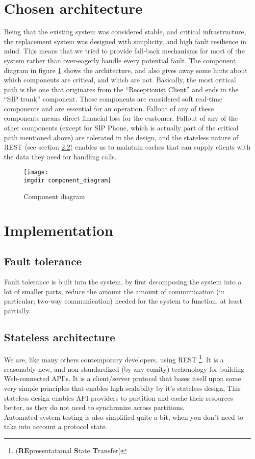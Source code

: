 \section{Chosen architecture}
Being that the existing system was considered stable, and critical infrastructure, the replacement system was designed with simplicity, and high fault resilience in mind. This means that we tried to provide fall-back mechanisms for most of the system rather than over-eagerly handle every potential fault. The component diagram in figure \ref{fig:component_diagram} shows the architecture, and also gives away some hints about which components are critical, and which are not. Basically, the most critical path is the one that originates from the ``Receptionist Client'' and ends in the ``SIP trunk'' component. These components are considered soft real-time components and are essential for an operation. Fallout of any of these components means direct financial loss for the customer. Fallout of any of the other components (except for SIP Phone, which is actually part of the critical path mentioned above) are tolerated in the design, and the stateless nature of REST (see section \ref{sec:rest}) enables us to maintain caches that can supply clients with the data they need for handling calls.


\begin{figure}[ht]
\centering
\texttt{[image: \\imgdir component\_diagram]}
\caption{Component diagram}
\label{fig:component_diagram}
\end{figure}

\section{Implementation}
\subsection{Fault tolerance}
Fault tolerance is built into the system, by first decomposing the system into a lot of smaller parts, reduce the amount the amount of communication (in particular; two-way communication) needed for the system to function, at least partially.

\subsection{Stateless architecture}
\label{sec:rest}
We are, like many others contemporary developers, using REST \footnote{(\textbf{RE}presentational \textbf{S}tate \textbf{T}ransfer)}. It is a reasonably new, and non-standardized (by any comity) techonology for building Web-connected API's. It is a client/server protocol that bases itself upon some very simple principles that enables high scalabilty by it's stateless design, This stateless design enables API providers to partition and cache their resources better, as they do not need to synchronize across partitions.\\
Automated system testing is also simplified quite a bit, when you don't need to take into account a protocol state.

